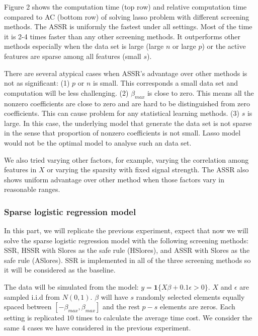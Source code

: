 \documentclass{article}
\begin{document}
Figure 2 shows the computation time (top row) and relative computation time compared to AC (bottom row) of solving lasso problem with different screening methods. The ASSR is uniformly the fastest under all settings. Most of the time it is 2-4 times faster than any other screening methods. It outperforms other methods especially when the data set is large (large $n$ or large $p$) or the active features are sparse among all features (small $s$). 

There are several atypical cases when ASSR's advantage over other methods is not as significant: (1) $p$ or $n$ is small. This corresponds a small data set and computation will be less challenging. (2) $\beta_{max}$ is close to zero. This means all the nonzero coefficients are close to zero and are hard to be distinguished from zero coefficients. This can cause problem for any statistical learning methods. (3) $s$ is large. In this case, the underlying model that generate the data set is not sparse in the sense that proportion of nonzero coefficients is not small. Lasso model would not be the optimal model to analyse such an data set.

We also tried varying other factors, for example, varying the correlation among features in $X$ or varying the sparsity with fixed signal strength. The ASSR also shows uniform advantage over other method when those factors vary in reasonable ranges.

\subsubsection{Sparse logistic regression model}

In this part, we will replicate the previous experiment, expect that now we will solve the sparse logistic regression model with the following screening methods: SSR, HSSR with Slores as the safe rule (HSlores), and ASSR with Slores as the safe rule (ASlores). SSR is implemented in all of the three screening methods so it will be considered as the baseline.

The data will be simulated from the model: $y=\mathbf{1}\{X\beta+0.1\epsilon >0\}$. $X$ and $\epsilon$ are sampled i.i.d from $N(0,1)$. $\beta$ will have $s$ randomly selected elements equally spaced between $[-\beta_{max},\beta_{max}]$ and the rest $p-s$ elements are zeros. Each setting is replicated $10$ times to calculate the average time cost. We consider the same 4 cases we have considered in the previous experiment.
\end{document}
